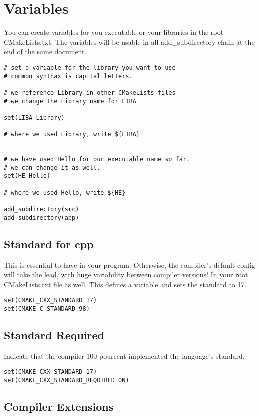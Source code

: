 \documentclass[openany]{report}
\begin{document}
\section{Variables}

You can create variables for you executable or your libraries in the root CMakeLists.txt. The variables
will be usable in all add\_subdirectory chain at the end of the same document.

\begin{verbatim}
# set a variable for the library you want to use
# common synthax is capital letters.

# we reference Library in other CMakeLists files
# we change the Library name for LIBA

set(LIBA Library)

# where we used Library, write ${LIBA}


# we have used Hello for our executable name so far.
# we can change it as well.
set(HE Hello)

# where we used Hello, write ${HE}

add_subdirectory(src)
add_subdirectory(app)
\end{verbatim}


\subsection{Standard for cpp}

This is essential to have in your program. Otherwise, the compiler's default config will take the lead, with huge
variability between compiler versions!
In your root CMakeLists.txt file as well. This defines a variable and sets the standard to 17.

\begin{verbatim}
set(CMAKE_CXX_STANDARD 17)
set(CMAKE_C_STANDARD 98)
\end{verbatim}

\subsection{Standard Required}

Indicate that the compiler 100 pourcent implemented the language's standard.

\begin{verbatim}
set(CMAKE_CXX_STANDARD 17)
set(CMAKE_CXX_STANDARD_REQUIRED ON)
\end{verbatim}

\subsection{Compiler Extensions}
\end{document}
